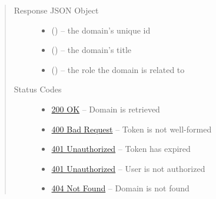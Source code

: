 \documentclass[letterpaper,10pt,english]{sphinxmanual}
\begin{document}
\begin{fulllineitems}
\begin{quote}
\begin{description}
\begin{itemize}
\end{itemize}

\item[{Response JSON Object}] \leavevmode\begin{itemize}
\item {} 
 () -- the domain's unique id

\item {} 
 () -- the domain's title

\item {} 
 () -- the role the domain is related to

\end{itemize}

\item[{Status Codes}] \leavevmode\begin{itemize}
\item {} 
\href{http://www.w3.org/Protocols/rfc2616/rfc2616-sec10.html\#sec10.2.1}{200 OK} -- Domain is retrieved

\item {} 
\href{http://www.w3.org/Protocols/rfc2616/rfc2616-sec10.html\#sec10.4.1}{400 Bad Request} -- Token is not well-formed

\item {} 
\href{http://www.w3.org/Protocols/rfc2616/rfc2616-sec10.html\#sec10.4.2}{401 Unauthorized} -- Token has expired

\item {} 
\href{http://www.w3.org/Protocols/rfc2616/rfc2616-sec10.html\#sec10.4.2}{401 Unauthorized} -- User is not authorized

\item {} 
\href{http://www.w3.org/Protocols/rfc2616/rfc2616-sec10.html\#sec10.4.5}{404 Not Found} -- Domain is not found

\end{itemize}

\end{description}\end{quote}

\end{fulllineitems}
\end{document}

